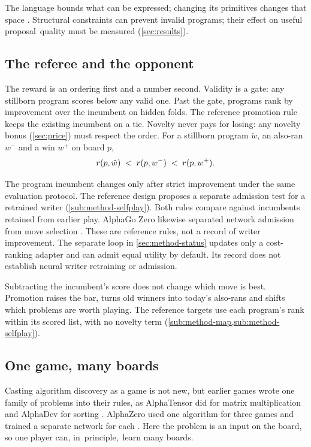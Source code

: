The language bounds what can be expressed; changing its primitives changes
that space \citep{boden1990creative}. Structural constraints can prevent invalid programs; their effect on useful \mbox{proposal
quality} must be measured (\cref{sec:results}).

\subsection{The referee and the opponent}\label{sub:game-referee}

The reward is an ordering first and a number second. Validity is a gate: any
stillborn program scores below any valid one. Past the gate, programs rank by
improvement over the incumbent on hidden folds. The reference promotion
rule keeps the existing incumbent on a tie. Novelty never pays for losing: any novelty
bonus (\cref{sec:price}) must respect the order. For a stillborn program
$\tilde{w}$, an also-ran $w^-$ and a win $w^+$ on board $p$,
\[
  r(p, \tilde{w}) \;<\; r(p, w^-) \;<\; r(p, w^+).
\]

The program incumbent changes only after strict improvement under the
same evaluation protocol. The reference design proposes a separate
admission test for a retrained writer (\cref{sub:method-selfplay}).
Both rules compare against incumbents retained from earlier play.
AlphaGo Zero likewise separated network admission from move selection
\citep{silver2017mastering}. These are reference rules, not a record of
writer improvement. The separate loop in \cref{sec:method-status} updates
only a cost-ranking adapter and can admit equal utility by default.
Its record does not establish neural writer retraining or admission.

Subtracting the incumbent's score does not change which move is best.
Promotion raises the bar, turns old winners
into today's also-rans and shifts which problems are worth playing. The
reference targets use each program's rank within its scored list, with no
novelty term (\cref{sub:method-map,sub:method-selfplay}).

\subsection{One game, many boards}\label{sub:game-boards}

Casting algorithm discovery as a game is not new, but earlier games wrote one
family of problems into their rules, as AlphaTensor did for matrix
multiplication and AlphaDev for sorting
\citep{fawzi2022alphatensor,mankowitz2023alphadev}. AlphaZero used one algorithm
for three games and trained a separate network for each
\citep{silver2018general}. Here the problem is an input on the board, so one
player can, \mbox{in principle, learn} many boards.

